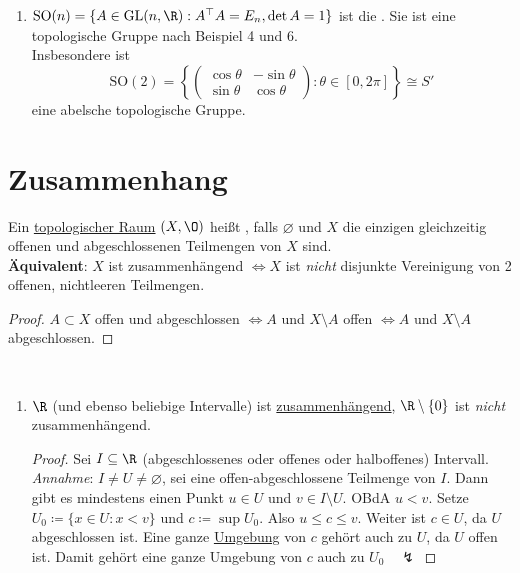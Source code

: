 \begin{example}
\begin{enumerate}
    \item \( \text{SO}(n) = \{ A \in \text{GL}(n,\R) : A^\top A = E_n, \det A = 1 \} \) ist die . Sie ist eine topologische Gruppe nach Beispiel 4 und 6. \\
      Insbesondere ist
      \begin{equation*}
        \text{SO}(2) = \left \{ \begin{pmatrix}
          \cos \theta & -\sin \theta \\
          \sin \theta & \cos \theta
        \end{pmatrix} : \theta \in [0, 2\pi] \right \} \cong S'
      \end{equation*}
      eine abelsche topologische Gruppe.
  \end{enumerate}
\end{example}

\section{Zusammenhang}

\begin{definition}[Zusammenhängend]\label{def:zusammenhaengend}
  Ein \hyperref[def:topologie]{topologischer Raum} \( (X, \O) \) heißt , falls \( \varnothing \) und \( X \) die einzigen gleichzeitig offenen und abgeschlossenen Teilmengen von \( X \) sind. \\
  \textbf{Äquivalent}: \( X \) ist zusammenhängend \( \Leftrightarrow X \) ist \emph{nicht} disjunkte Vereinigung von 2 offenen, nichtleeren Teilmengen.
  \begin{proof}
    \( A \subset X \) offen und abgeschlossen \( \Leftrightarrow A \) und \( X \setminus A \) offen \( \Leftrightarrow A \) und \( X \setminus A \) abgeschlossen.
  \end{proof}
\end{definition}

\begin{example}[Zusammenhang]
  \
  \begin{enumerate}
    \item \( \R \) (und ebenso beliebige Intervalle) ist \hyperref[def:zusammenhaengend]{zusammenhängend}, \( \R \setminus \{ 0 \} \) ist \emph{nicht} zusammenhängend.
    \begin{proof}
      Sei \( I \subseteq \R \) (abgeschlossenes oder offenes oder halboffenes) Intervall. \\
      \emph{Annahme}: \( I \neq U \neq \varnothing \), sei eine offen-abgeschlossene Teilmenge von \( I \). Dann gibt es mindestens einen Punkt \( u \in U \) und \( v \in I \setminus U \). OBdA \( u < v \). Setze \( U_0 \coloneqq \{ x \in U : x < v \} \) und \( c \coloneqq \sup U_0 \). Also \( u \leq c \leq v \). Weiter ist \( c \in U \), da \( U \) abgeschlossen ist. Eine ganze \hyperref[def:umgebung]{Umgebung} von \( c \) gehört auch zu \( U \), da \( U \) offen ist. Damit gehört eine ganze Umgebung von \( c \) auch zu \( U_0 \quad \lightning \)
    \end{proof}
  \end{enumerate}
\end{example}

